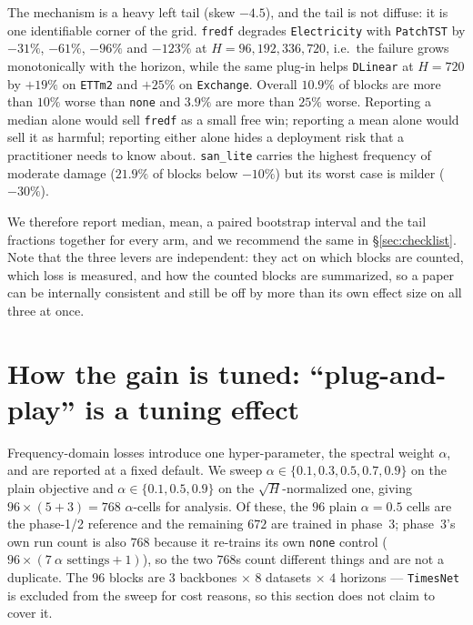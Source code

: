 \documentclass[a4paper,fleqn]{cas-sc}
\newcommand{\arm}[1]{\texttt{#1}}
\begin{document}
The mechanism is a heavy left tail (skew $-4.5$), and the tail is not diffuse: it
is one identifiable corner of the grid. \arm{fredf} degrades
\texttt{Electricity} with \arm{PatchTST} by $-31\%$, $-61\%$, $-96\%$ and
$-123\%$ at $H{=}96,192,336,720$, i.e.\ the failure grows monotonically with the
horizon, while the same plug-in helps \arm{DLinear} at $H{=}720$ by $+19\%$ on
\texttt{ETTm2} and $+25\%$ on \texttt{Exchange}. Overall $10.9\%$ of blocks are
more than $10\%$ worse than \arm{none} and $3.9\%$ are more than $25\%$ worse.
Reporting a median alone would sell \arm{fredf} as a small free win; reporting a
mean alone would sell it as harmful; reporting either alone hides a deployment
risk that a practitioner needs to know about. \arm{san\_lite} carries the highest
frequency of moderate damage ($21.9\%$ of blocks below $-10\%$) but its worst
case is milder ($-30\%$).



We therefore report median, mean, a paired bootstrap interval and the tail
fractions together for every arm, and we recommend the same in
\S\ref{sec:checklist}. Note that the three levers are independent: they act on
which blocks are counted, which loss is measured, and how the counted blocks are
summarized, so a paper can be internally consistent and still be off by more
than its own effect size on all three at once.

\section{How the gain is tuned: ``plug-and-play'' is a tuning effect}
\label{sec:tuning}

Frequency-domain losses introduce one hyper-parameter, the spectral weight
$\alpha$, and are reported at a fixed default. We sweep
$\alpha\in\{0.1,0.3,0.5,0.7,0.9\}$ on the plain objective and
$\alpha\in\{0.1,0.5,0.9\}$ on the $\sqrt{H}$-normalized one, giving
$96\times(5+3)=768$ $\alpha$-cells for analysis. Of these, the $96$ plain
$\alpha{=}0.5$ cells are the phase-1/2 reference and the remaining $672$ are
trained in phase~3; phase~3's own run count is also $768$ because it re-trains
its own \arm{none} control ($96\times(7\ \alpha\text{ settings}+1)$), so the two
$768$s count different things and are not a duplicate.
The $96$ blocks are $3$ backbones $\times$ $8$ datasets $\times$ $4$ horizons ---
\arm{TimesNet} is excluded from the sweep for cost reasons, so this section does
not claim to cover it.
\end{document}
